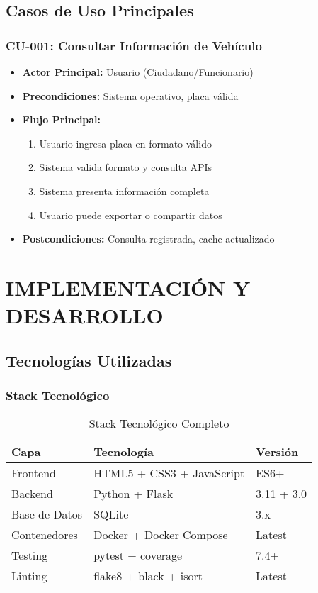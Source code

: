 \documentclass[12pt,a4paper]{article}
\begin{document}
\subsection{Casos de Uso Principales}

\subsubsection{CU-001: Consultar Información de Vehículo}

\begin{itemize}
    \item \textbf{Actor Principal:} Usuario (Ciudadano/Funcionario)
    \item \textbf{Precondiciones:} Sistema operativo, placa válida
    \item \textbf{Flujo Principal:}
    \begin{enumerate}
        \item Usuario ingresa placa en formato válido
        \item Sistema valida formato y consulta APIs
        \item Sistema presenta información completa
        \item Usuario puede exportar o compartir datos
    \end{enumerate}
    \item \textbf{Postcondiciones:} Consulta registrada, cache actualizado
\end{itemize}

\section{IMPLEMENTACIÓN Y DESARROLLO}

\subsection{Tecnologías Utilizadas}

\subsubsection{Stack Tecnológico}

\begin{table}[h]
\centering
\begin{tabularx}{\textwidth}{|l|X|X|}
\hline
\textbf{Capa} & \textbf{Tecnología} & \textbf{Versión} \\
\hline
Frontend & HTML5 + CSS3 + JavaScript & ES6+ \\
\hline
Backend & Python + Flask & 3.11 + 3.0 \\
\hline
Base de Datos & SQLite & 3.x \\
\hline
Contenedores & Docker + Docker Compose & Latest \\
\hline
Testing & pytest + coverage & 7.4+ \\
\hline
Linting & flake8 + black + isort & Latest \\
\hline
\end{tabularx}
\caption{Stack Tecnológico Completo}
\end{table}
\end{document}
